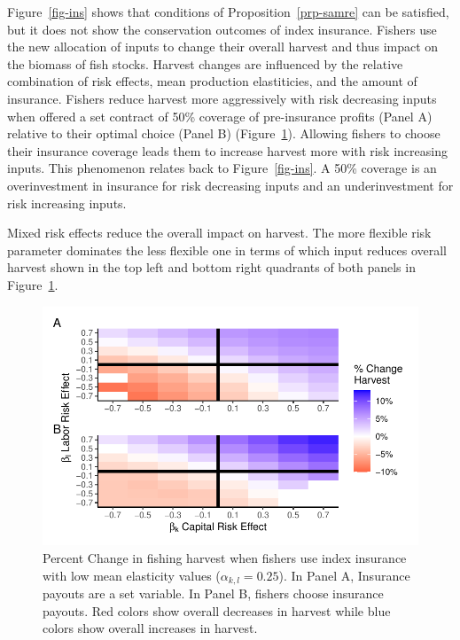 \documentclass[
  letterpaper,
  DIV=11,
  numbers=noendperiod]{scrartcl}
\theoremstyle{plain}
\theoremstyle{plain}
\theoremstyle{remark}
\begin{document}
Figure~\ref{fig-ins} shows that conditions of
Proposition~\ref{prp-samre} can be satisfied, but it does not show the
conservation outcomes of index insurance. Fishers use the new allocation
of inputs to change their overall harvest and thus impact on the biomass
of fish stocks. Harvest changes are influenced by the relative
combination of risk effects, mean production elastiticies, and the
amount of insurance. Fishers reduce harvest more aggressively with risk
decreasing inputs when offered a set contract of 50\% coverage of
pre-insurance profits (Panel A) relative to their optimal choice (Panel
B) (Figure~\ref{fig-multi-h-even}). Allowing fishers to choose their
insurance coverage leads them to increase harvest more with risk
increasing inputs. This phenomenon relates back to Figure~\ref{fig-ins}.
A 50\% coverage is an overinvestment in insurance for risk decreasing
inputs and an underinvestment for risk increasing inputs.

Mixed risk effects reduce the overall impact on harvest. The more
flexible risk parameter dominates the less flexible one in terms of
which input reduces overall harvest shown in the top left and bottom
right quadrants of both panels in Figure~\ref{fig-multi-h-even}.

\begin{figure}

{\centering \includegraphics{ibi-behavior_files/figure-pdf/fig-multi-h-even-1.pdf}

}

\caption{\label{fig-multi-h-even}Percent Change in fishing harvest when
fishers use index insurance with low mean elasticity values
(\(\alpha_{k,l}=0.25\)). In Panel A, Insurance payouts are a set
variable. In Panel B, fishers choose insurance payouts. Red colors show
overall decreases in harvest while blue colors show overall increases in
harvest.}

\end{figure}
\end{document}

